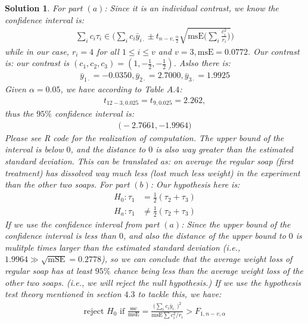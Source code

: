 \documentclass[11pt]{article}
\newtheorem{sol}{Solution}
\begin{document}
\begin{sol}
	For part $(a)$:\vskip 2mm
	Since it is an individual contrast, we know the confidence interval is:
	\begin{align*}
		\sum_i c_i\tau_i \in \Big(\sum_i c_i\bar{y}_{i\cdot} \pm t_{n - v, \frac{\alpha}{2}}\sqrt{\text{msE}\Big(\sum_i\frac{c_i^2}{r_i}\Big)}\Big)
	\end{align*}
	while in our case, $r_i = 4$ for all $1 \leq i \leq v$ and $v = 3, \text{msE} = 0.0772$. Our contrast is: our contrast is $(c_1, c_2, c_3) = (1, -\frac{1}{2}, -\frac{1}{2})$. \vskip 2mm
	Aslso there is:
	\begin{align*}
		\bar{y}_{1\cdot} = -0.0350, \bar{y}_{2\cdot} = 2.7000, \bar{y}_{3\cdot} = 1.9925
	\end{align*}
	Given $\alpha = 0.05$, we have according to Table $A.4$:
	\begin{align*}
		t_{12 - 3, 0.025} = t_{9, 0.025} = 2.262, 
	\end{align*}
	thus the $95\%$ confidence interval is:
	\begin{align*}
		\Big(-2.7661, -1.9964\Big)
	\end{align*}
	Please see R code for the realization of computation.\vskip 2mm
	The upper bound of the interval is below $0$, and the distance to $0$ is also way greater than the estimated standard deviation. This can be translated as: on average the regular soap (first treatment) has dissolved way much less (lost much less weight) in the experiment than the other two soaps.\vskip 2mm
	For part $(b)$:\vskip 2mm
	Our hypothesis here is:
	\begin{align*}
		H_0: \tau_1 &= \frac{1}{2}(\tau_2 + \tau_3)\\
		H_a: \tau_1 &\neq  \frac{1}{2}(\tau_2 + \tau_3)
	\end{align*}
	If we use the confidence interval from part $(a)$:\vskip 2mm
	Since the upper bound of the confidence interval is less than $0$, and also the distance of the upper bound to $0$ is mulitple times larger than the estimated standard deviation (i.e., $1.9964 \gg  \sqrt{\text{mSE}} = 0.2778$), so we can conclude that the average weight loss of regular soap has at least $95\%$ chance being less than the average weight loss of the other two soaps. (i.e., we will reject the null hypothesis.)\vskip 2mm
	If we use the hypothesis test theory mentioned in section $4.3$ to tackle this, we have:
	\begin{align*}
		\text{reject } H_0 \text{ if } \frac{\text{ssc}}{\text{msE}} = \frac{\Big(\sum_ic_i\bar{y}_{i\cdot}\Big)^2}{\text{msE}\sum c_i^2/r_i} > F_{1, n - v, \alpha}

\end{align*}
\end{sol}
\end{document}
